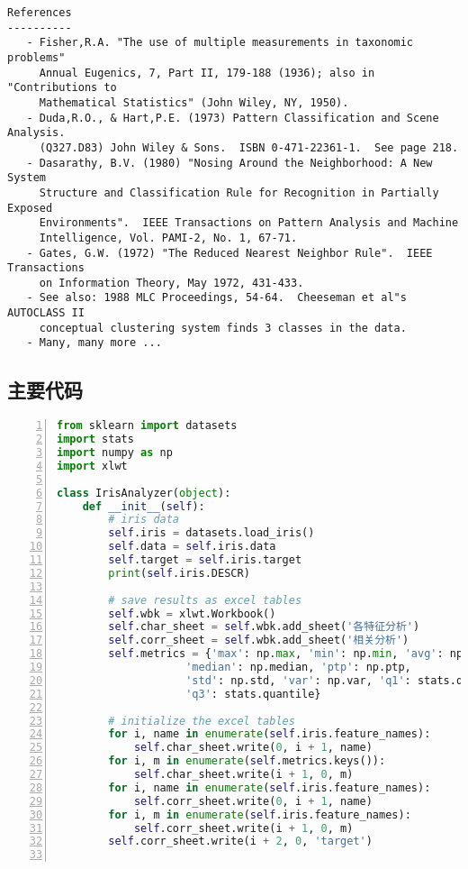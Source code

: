\documentclass[12pt,a4paper]{article}
\theoremstyle{definition}
\begin{document}
\begin{appendix}
\begin{lstlisting}[frame=shadowbox, breaklines=True, title=Iris数据集基本描述]
References
----------
   - Fisher,R.A. "The use of multiple measurements in taxonomic problems"
     Annual Eugenics, 7, Part II, 179-188 (1936); also in "Contributions to
     Mathematical Statistics" (John Wiley, NY, 1950).
   - Duda,R.O., & Hart,P.E. (1973) Pattern Classification and Scene Analysis.
     (Q327.D83) John Wiley & Sons.  ISBN 0-471-22361-1.  See page 218.
   - Dasarathy, B.V. (1980) "Nosing Around the Neighborhood: A New System
     Structure and Classification Rule for Recognition in Partially Exposed
     Environments".  IEEE Transactions on Pattern Analysis and Machine
     Intelligence, Vol. PAMI-2, No. 1, 67-71.
   - Gates, G.W. (1972) "The Reduced Nearest Neighbor Rule".  IEEE Transactions
     on Information Theory, May 1972, 431-433.
   - See also: 1988 MLC Proceedings, 54-64.  Cheeseman et al"s AUTOCLASS II
     conceptual clustering system finds 3 classes in the data.
   - Many, many more ...
		\end{lstlisting}
		
	\subsection{主要代码}
		\begin{lstlisting}[numbers=left, language=Python, frame=shadowbox, breaklines=True, title=Iris数据集探索代码]
from sklearn import datasets
import stats
import numpy as np
import xlwt

class IrisAnalyzer(object):
    def __init__(self):
        # iris data
        self.iris = datasets.load_iris()
        self.data = self.iris.data
        self.target = self.iris.target
        print(self.iris.DESCR)

        # save results as excel tables
        self.wbk = xlwt.Workbook()
        self.char_sheet = self.wbk.add_sheet('各特征分析')
        self.corr_sheet = self.wbk.add_sheet('相关分析')
        self.metrics = {'max': np.max, 'min': np.min, 'avg': np.mean,
                    'median': np.median, 'ptp': np.ptp,
                    'std': np.std, 'var': np.var, 'q1': stats.quantile,
                    'q3': stats.quantile}

        # initialize the excel tables
        for i, name in enumerate(self.iris.feature_names):
            self.char_sheet.write(0, i + 1, name)
        for i, m in enumerate(self.metrics.keys()):
            self.char_sheet.write(i + 1, 0, m)
        for i, name in enumerate(self.iris.feature_names):
            self.corr_sheet.write(0, i + 1, name)
        for i, m in enumerate(self.iris.feature_names):
            self.corr_sheet.write(i + 1, 0, m)
        self.corr_sheet.write(i + 2, 0, 'target')


\end{lstlisting}
\end{appendix}
\end{document}

